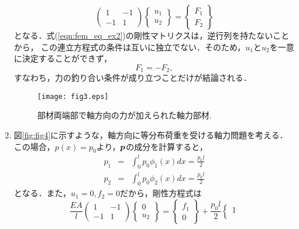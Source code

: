 \documentclass[10pt,a4j]{jarticle}
\begin{document}
\begin{enumerate}
\begin{equation}
	\left(
	\begin{array}{cc}
		1 & -1 \\
		-1 & 1
	\end{array}
	\right)
	\left\{
	\begin{array}{c}
		u_1 \\
		u_2
	\end{array}
	\right\}
	=
	\left\{
	\begin{array}{c}
		F_1\\
		F_2
	\end{array}
	\right\}
	\label{eqn:fem_eq_ex2}
\end{equation}
となる．式(\ref{eqn:fem_eq_ex2})の剛性マトリクスは，逆行列を持たないことから，
この連立方程式の条件は互いに独立でない．そのため，$u_1$と$u_2$を一意に決定することができず，
\begin{equation}
	F_1=-F_2, 
\end{equation}
すなわち，力の釣り合い条件が成り立つことだけが結論される．
\begin{figure}[h]
	\begin{center}
	\texttt{[image: fig3.eps]} 
	\end{center}
	\caption{部材両端部で軸方向の力が加えられた軸力部材.} 
	\label{fig:fig3}
\end{figure}
\item
図\ref{fig:fig4}に示すような，軸方向に等分布荷重を受ける軸力問題を考える．
この場合，$p(x)=p_0$より，$\mbox{\boldmath $p$}$の成分を計算すると，
\begin{eqnarray}
	p_1 &= & \int_0^l p_0 \phi_1(x) dx = \frac{p_0l}{2} 
	\label{eqn:}
	\\
	p_2 &= & \int_0^l p_0 \phi_2(x) dx = \frac{p_0l}{2} 
	\label{eqn:}
\end{eqnarray}
となる．また，$u_1=0, f_2=0$だから，剛性方程式は
\begin{equation}
	\frac{EA}{l}
	\left(
	\begin{array}{cc}
		1 & -1 \\
		-1 & 1
	\end{array}
	\right)
	\left\{
	\begin{array}{c}
		0 \\
		u_2
	\end{array}
	\right\}
	=
	\left\{
	\begin{array}{c}
		f_1 \\
		0	
	\end{array}
	\right\}
	+
	\frac{p_0l}{2}
	\left\{
	\begin{array}{c}
		1 \\ 

\end{array}
\end{equation}
\end{enumerate}
\end{document}
